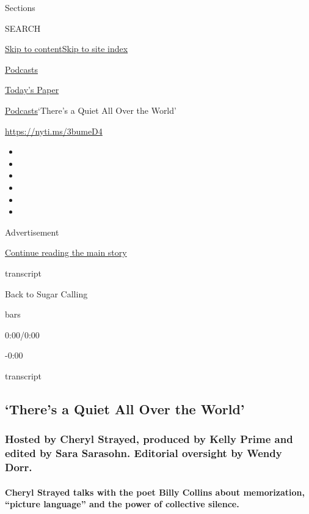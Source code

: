 Sections

SEARCH

\protect\hyperlink{site-content}{Skip to
content}\protect\hyperlink{site-index}{Skip to site index}

\href{https://www.nytimes.com/spotlight/podcasts}{Podcasts}

\href{https://myaccount.nytimes.com/auth/login?response_type=cookie\&client_id=vi}{}

\href{https://www.nytimes.com/section/todayspaper}{Today's Paper}

\href{/spotlight/podcasts}{Podcasts}\textbar{}`There's a Quiet All Over
the World'

\url{https://nyti.ms/3bumeD4}

\begin{itemize}
\item
\item
\item
\item
\item
\item
\end{itemize}

Advertisement

\protect\hyperlink{after-top}{Continue reading the main story}

transcript

Back to Sugar Calling

bars

0:00/0:00

-0:00

transcript

\hypertarget{theres-a-quiet-all-over-the-world}{%
\subsection{`There's a Quiet All Over the
World'}\label{theres-a-quiet-all-over-the-world}}

\hypertarget{hosted-by-cheryl-strayed-produced-by-kelly-prime-and-edited-by-sara-sarasohn-editorial-oversight-by-wendy-dorr}{%
\subsubsection{Hosted by Cheryl Strayed, produced by Kelly Prime and
edited by Sara Sarasohn. Editorial oversight by Wendy
Dorr.}\label{hosted-by-cheryl-strayed-produced-by-kelly-prime-and-edited-by-sara-sarasohn-editorial-oversight-by-wendy-dorr}}

\hypertarget{cheryl-strayed-talks-with-the-poet-billy-collins-about-memorization-picture-language-and-the-power-of-collective-silence}{%
\paragraph{Cheryl Strayed talks with the poet Billy Collins about
memorization, ``picture language'' and the power of collective
silence.}\label{cheryl-strayed-talks-with-the-poet-billy-collins-about-memorization-picture-language-and-the-power-of-collective-silence}}

